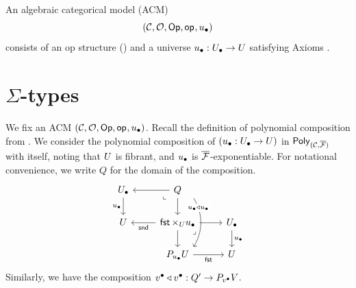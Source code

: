 \begin{definition}\label{def:ACM-universe}
  An algebraic categorical model (ACM)
  \[(\mathcal{C},{\mathcal{O}},\mathop{\mathsf{Op}},\mathop{\mathsf{op}_{}} ,{u_\bullet})\]
  consists of an op structure ()
  and a universe ${u_\bullet} : {U_\bullet} \to U$ satisfying
  Axioms .
\end{definition}

\section*{$\Sigma$-types}
We fix an ACM $(\mathcal{C},{\mathcal{O}},\mathop{\mathsf{Op}},\mathop{\mathsf{op}_{}} ,{u_\bullet})$.
Recall the definition of polynomial composition from .
We consider the polynomial composition of $({u_\bullet} : {U_\bullet} \to U)$
in $\mathsf{Poly}_{(\mathcal{C},{\overline{{\mathcal{F}}}})}$ with itself,
noting that $U$ is fibrant, and ${u_\bullet}$ is ${\overline{{\mathcal{F}}}}$-exponentiable.
For notational convenience, we write $Q$ for the domain of the composition.
\[\begin{tikzcd}
	\Ulow & Q & \\
	\U & \fstProj \times_\U \ulow & \Ulow \\
	& {P_\ulow \U} & \U
	\arrow["\ulow"', from=1-1, to=2-1]
	\arrow[from=1-2, to=1-1]
	\arrow["\lrcorner"{anchor=center, pos=0.125, rotate=-90}, draw=none, from=1-2, to=2-1]
	\arrow[from=1-2, to=2-2]
	\arrow["{{\ulow \pcomp \ulow}}"{description, pos=0.2}, shift left=5, bend left, from=1-2, to=3-2]
	\arrow["{{{\sndProj}}}", from=2-2, to=2-1]
	\arrow[from=2-2, to=2-3]
	\arrow[from=2-2, to=3-2]
	\arrow["\lrcorner"{anchor=center, pos=0.125}, draw=none, from=2-2, to=3-3]
	\arrow["\ulow", from=2-3, to=3-3]
	\arrow["{{{\fstProj}}}"', from=3-2, to=3-3]
\end{tikzcd}\]
Similarly, we have the composition ${v^\bullet} \triangleleft {v^\bullet} : Q' \to P_{v^\bullet} V$.

